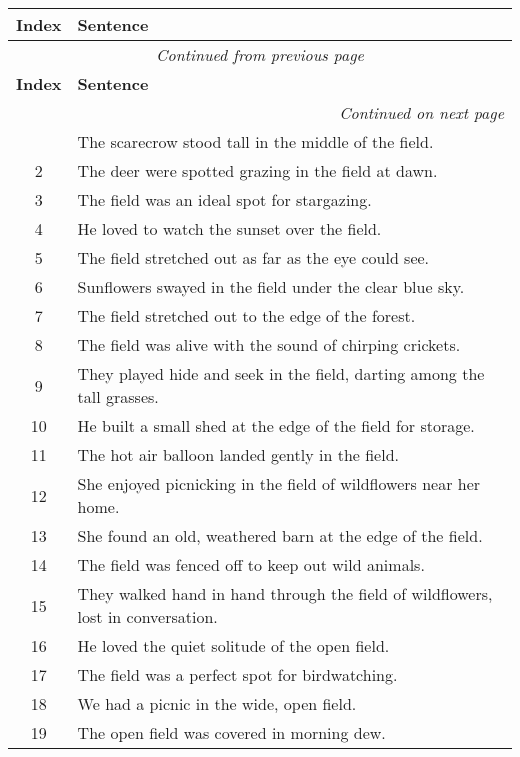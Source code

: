 
    \begin{longtable}{|c|p{12cm}|}
    \hline
    \textbf{Index} & \textbf{Sentence} \\ \hline
    \endfirsthead
    \multicolumn{2}{c}{\textit{Continued from previous page}} \\ \hline
    \textbf{Index} & \textbf{Sentence} \\ \hline
    \endhead
    \hline \multicolumn{2}{r}{\textit{Continued on next page}} \\ \hline
    \endfoot
    \hline
    \endlastfoot
    1 & The scarecrow stood tall in the middle of the field. \\ \hline
2 & The deer were spotted grazing in the field at dawn. \\ \hline
3 & The field was an ideal spot for stargazing. \\ \hline
4 & He loved to watch the sunset over the field. \\ \hline
5 & The field stretched out as far as the eye could see. \\ \hline
6 & Sunflowers swayed in the field under the clear blue sky. \\ \hline
7 & The field stretched out to the edge of the forest. \\ \hline
8 & The field was alive with the sound of chirping crickets. \\ \hline
9 & They played hide and seek in the field, darting among the tall grasses. \\ \hline
10 & He built a small shed at the edge of the field for storage. \\ \hline
11 & The hot air balloon landed gently in the field. \\ \hline
12 & She enjoyed picnicking in the field of wildflowers near her home. \\ \hline
13 & She found an old, weathered barn at the edge of the field. \\ \hline
14 & The field was fenced off to keep out wild animals. \\ \hline
15 & They walked hand in hand through the field of wildflowers, lost in conversation. \\ \hline
16 & He loved the quiet solitude of the open field. \\ \hline
17 & The field was a perfect spot for birdwatching. \\ \hline
18 & We had a picnic in the wide, open field. \\ \hline
19 & The open field was covered in morning dew. \\ \hline

\end{longtable}
